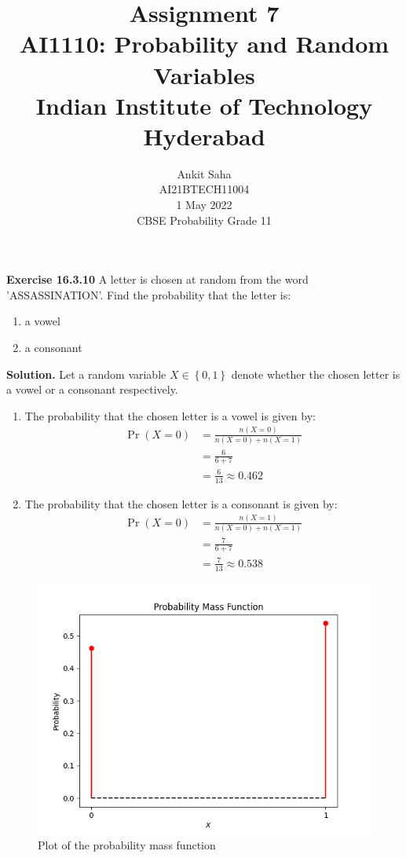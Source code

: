 \documentclass[journal,12pt,twocolumn]{IEEEtran}
\title{Assignment 7 \\ \Large AI1110: Probability and Random Variables \\ \large Indian Institute of Technology Hyderabad}
\author{Ankit Saha \\ \normalsize AI21BTECH11004 \\ \vspace*{20pt} \normalsize  1 May 2022 \\ \vspace*{20pt} \Large CBSE Probability Grade 11}
\providecommand{\pr}[1]{\ensuremath{\Pr\left(#1\right)}}
\providecommand{\cbrak}[1]{\ensuremath{\left\{#1\right\}}}
\begin{document}
	\maketitle
	
	\textbf{Exercise 16.3.10} 
	A letter is chosen at random from the word 'ASSASSINATION'. Find the probability that the letter is:
	\begin{enumerate}[label=(\roman*)]
	\item a vowel
	\item a consonant
	\end{enumerate}	 
	
	\textbf{Solution.}
	Let a random variable $X \in \cbrak{0,1}$ denote whether the chosen letter is a vowel or a consonant respectively.
	\begin{table}[ht!]
		\centering
		
		\caption{}
		\label{table:table1}	
	\end{table}
	
	\begin{enumerate}[label=(\roman*)]
	\item The probability that the chosen letter is a vowel is given by:
	\begin{align}
		\pr{X=0} &= \frac{n(X=0)}{n(X=0)+n(X=1)} \\
		&= \frac{6}{6+7} \\
		&= \frac{6}{13} \approx 0.462
	\end{align}
	
	\item The probability that the chosen letter is a consonant is given by:
	\begin{align}
		\pr{X=0} &= \frac{n(X=1)}{n(X=0)+n(X=1)} \\
		&= \frac{7}{6+7} \\
		&= \frac{7}{13} \approx 0.538
	\end{align}	
	\end{enumerate}
	
	\begin{figure}[!ht]
		\centering
		\includegraphics[width=\columnwidth]{figs/fig-1.png}
		\caption{Plot of the probability mass function}
		\label{fig1}
	\end{figure}
	
\end{document}
